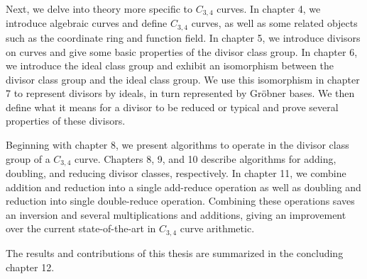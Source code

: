Next, we delve into theory more specific to $C_{3,4}$ curves.
In chapter 4, we introduce algebraic curves and define $C_{3,4}$ curves,
as well as some related objects such as the coordinate ring and function field.
In chapter 5, we introduce divisors on curves and give some basic properties of the divisor class group.
In chapter 6, we introduce the ideal class group and exhibit an isomorphism between the divisor class group and the ideal class group.
We use this isomorphism in chapter 7 to represent divisors by ideals, in turn represented by Gr\"obner bases.
We then define what it means for a divisor to be reduced or typical
and prove several properties of these divisors.

Beginning with chapter 8, we present algorithms to operate in the divisor class group of a $C_{3,4}$ curve.
Chapters 8, 9, and 10 describe algorithms for adding, doubling, and reducing divisor classes, respectively.
In chapter 11, we combine addition and reduction into a single add-reduce operation
as well as doubling and reduction into single double-reduce operation.
Combining these operations saves an inversion and several multiplications and additions,
giving an improvement over the current state-of-the-art in $C_{3,4}$ curve arithmetic.

The results and contributions of this thesis are summarized in the concluding chapter 12.


